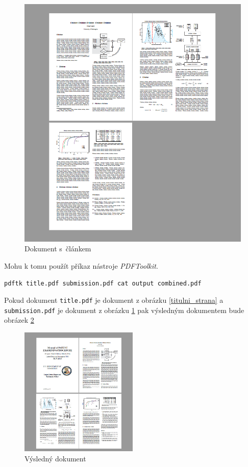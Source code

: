 \documentclass[czech,BP]{thesiskiv}
\begin{document}
\begin{figure}[h]
\begin{minipage}[b]{0.4\textwidth}
    	\includegraphics[width=\textwidth]{obr3.png}
    	\caption{Dokument s~článkem}
    	\label{clanek}
    \end{minipage}
\end{figure}
Mohu k tomu použít příkaz nástroje \emph{PDFToolkit}.
\begin{lstlisting}
pdftk title.pdf submission.pdf cat output combined.pdf
\end{lstlisting}
Pokud dokument \texttt{title.pdf} je dokument z obrázku \ref{titulni_strana} a \texttt{submission.pdf} je dokument z obrázku \ref{clanek} pak výsledným dokumentem bude obrázek \ref{kombinace}
\begin{figure}[h]
    \centering
    	\includegraphics[width=0.5\textwidth]{obr5.jpg}
    	\caption{Výsledný dokument}
    	\label{kombinace}
\end{figure}
\end{document}
